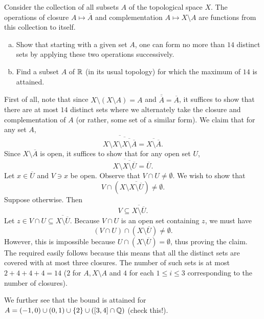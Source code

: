 \setcounter{exercise}{20}
\begin{exercise}
	Consider the collection of all subsets $A$ of the topological space $X$. The operations of closure $A\mapsto \overline{A}$ and complementation $A\mapsto X\setminus A$ are functions from this collection to itself.
	\begin{enumerate}[(a)]
		\item Show that starting with a given set $A$, one can form no more than $14$ distinct sets by applying these two operations successively.
		\item Find a subset $A$ of $\mathbb{R}$ (in its usual topology) for which the maximum of $14$ is attained.
	\end{enumerate}
\end{exercise}
\begin{solution*}
	First of all, note that since $X\setminus(X\setminus A) = A$ and $\overline{\overline{A}}=\overline{A}$, it suffices to show that there are at most $14$ distinct sets where we alternately take the closure and complementation of $A$ (or rather, some set of a similar form).
	We claim that for any set $A$,
	\[ \overline{X\setminus\overline{X\setminus\overline{X\setminus\overline{A}}}} = \overline{X\setminus\overline{A}}. \]
	Since $X\setminus\overline{A}$ is open, it suffices to show that for any open set $U$,
	\[ \overline{X\setminus\overline{X\setminus\overline{U}}} = \overline{U}. \]
	Let $x\in \overline{U}$ and $V\ni x$ be open. Observe that $V\cap U\neq \emptyset$. We wish to show that
	\[ V \cap \left(X\setminus\overline{X\setminus\overline{U}}\right) \neq \emptyset. \]
	Suppose otherwise. Then
	\[ V \subseteq \overline{X\setminus\overline{U}}. \]
	Let $z\in V\cap U\subseteq \overline{X\setminus\overline{U}}$. Because $V\cap U$ is an open set containing $z$, we must have
	\[ (V\cap U) \cap (X\setminus \overline{U}) \neq \emptyset. \]
	However, this is impossible because $U\cap (X\setminus \overline{U}) = \emptyset$, thus proving the claim.\\

	The required easily follows because this means that all the distinct sets are covered with at most three closures. The number of such sets is at most $2+4+4+4=14$ ($2$ for $A, X\setminus A$ and $4$ for each $1\leq i\leq 3$ corresponding to the number of closures).

	We further see that the bound is attained for $A = (-1,0)\cup(0,1)\cup\{2\}\cup([3,4]\cap\mathbb{Q})$ (check this!).
\end{solution*}